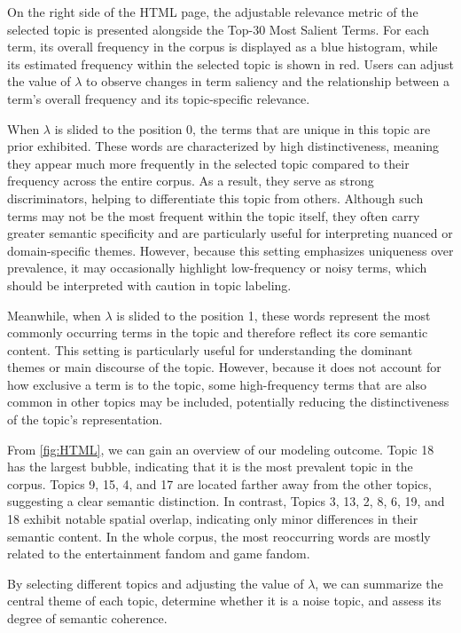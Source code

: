 \documentclass[12pt]{article}
\numberwithin{figure}{section}  %
\begin{document}
	On the right side of the HTML page, the adjustable relevance metric of the
	selected topic is presented alongside the Top-30 Most Salient Terms. For
	each term, its overall frequency in the corpus is displayed as a blue
	histogram, while its estimated frequency within the selected topic is shown
	in red. Users can adjust the value of $\lambda$ to observe changes in term
	saliency and the relationship between a term’s overall frequency and its
	topic-specific relevance. 
	
	When $\lambda$ is slided to the position 0, the terms that are unique in
	this topic are prior exhibited. These words are characterized by high
	distinctiveness, meaning they appear much more frequently in the selected
	topic compared to their frequency across the entire corpus. As a result,
	they serve as strong discriminators, helping to differentiate this topic
	from others. Although such terms may not be the most frequent within the
	topic itself, they often carry greater semantic specificity and are
	particularly useful for interpreting nuanced or domain-specific themes.
	However, because this setting emphasizes uniqueness over prevalence, it may
	occasionally highlight low-frequency or noisy terms, which should be
	interpreted with caution in topic labeling.
	
	Meanwhile, when $\lambda$ is slided to the position 1, these words represent
	the most commonly occurring terms in the topic and therefore reflect its
	core semantic content. This setting is particularly useful for understanding
	the dominant themes or main discourse of the topic. However, because it does
	not account for how exclusive a term is to the topic, some high-frequency
	terms that are also common in other topics may be included, potentially
	reducing the distinctiveness of the topic’s representation.
	 
	From \cref{fig:HTML}, we can gain an overview of our modeling outcome.
	Topic 18 has the largest bubble, indicating that it is the most prevalent
	topic in the corpus. Topics 9, 15, 4, and 17 are located farther away from
	the other topics, suggesting a clear semantic distinction. In contrast,
	Topics 3, 13, 2, 8, 6, 19, and 18 exhibit notable spatial overlap,
	indicating only minor differences in their semantic content. In the whole
	corpus, the most reoccurring words are mostly related to the entertainment
	fandom and game fandom.
	
	
	By selecting different topics and adjusting the value of $\lambda$, we can
	summarize the central theme of each topic, determine whether it is a noise
	topic, and assess its degree of semantic coherence.
	
\end{document}

